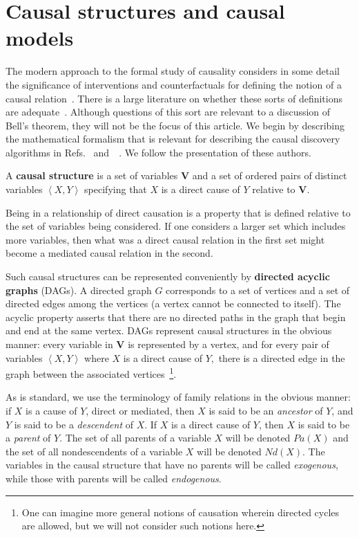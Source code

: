 \documentclass[12pt,onecolumn,nofootinbib]{revtex4-2}
\begin{document}
\section{Causal structures and causal models}
\label{sec:causalmod}

The modern approach to the formal study of causality considers in some detail the significance of interventions and counterfactuals for defining the notion of a causal relation~\cite{Pearl2009,Spirtes2001}.  There is a large literature on whether these sorts of definitions are adequate~\cite{OxfordHandbook}.   Although questions of this sort are relevant to a discussion of Bell's theorem, they will not be the focus of this article.
We begin by describing the mathematical formalism that is relevant for describing the causal discovery algorithms in Refs.~\cite{Pearl2009} and~~\cite{Spirtes2001}.  We follow the presentation of these authors.

A \textbf{causal structure} is a set of variables $\mathbf{V}$ and a set of
ordered pairs of distinct variables $\left\langle X,Y\right\rangle $
specifying that $X$ is a direct cause of $Y$ relative to $\mathbf{V}.$

Being in a relationship of direct causation is a property that is defined
relative to the set of variables being considered. If one considers a
larger set which includes more variables, then what was a direct causal
relation in the first set might become a mediated causal relation in the
second.

Such causal structures can be represented conveniently by \textbf{directed
acyclic graphs} (DAGs).  A directed graph $G$ corresponds to a set of
vertices and a set of directed edges among the vertices (a vertex cannot be
connected to itself).  The acyclic property asserts that there are no directed paths in
the graph that begin and end at the same vertex.  DAGs represent causal
structures in the obvious manner: every variable in $\mathbf{V}$ is
represented by a vertex, and for every pair of variables $\left\langle
X,Y\right\rangle $ where $X$ is a direct cause of $Y,$ there is a directed
edge in the graph between the associated vertices~\footnote{One can imagine more general notions of causation wherein directed cycles are allowed, but we will not consider such notions here.}.

As is standard, we use the terminology of family relations in the obvious manner: if $X$
is a cause of $Y$, direct or mediated, then $X$ is said to be an \emph{ancestor} of $Y$, and $Y$ is said to be a \emph{descendent} of $X$. If $X$ is a direct cause of $Y$, then $X$ is said to be a \emph{parent} of $Y$.    The set of all parents of a variable $X$ will be denoted $Pa(X)$ and the set of all nondescendents of a variable $X$ will be denoted $Nd(X)$.  \color{black} The variables in the causal structure that have no parents will be called \emph{exogenous}, while those with parents will be called \emph{endogenous}. 
\end{document}
